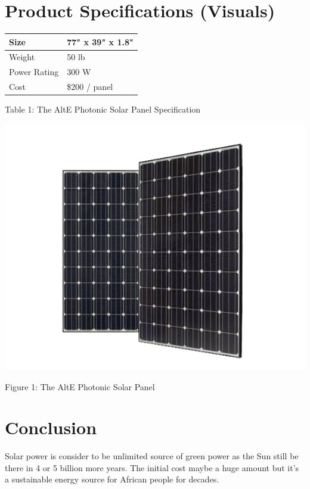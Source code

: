 \documentclass[letterpaper, 11pt]{article}
\begin{document}
\section*{Product Specifications (Visuals)}
\begin{center}
    \begin{tabular}{| l | l |}
    \hline
    Size & 77" x 39" x 1.8"  \\ \hline
    Weight & 50 lb  \\ \hline
    Power Rating & 300 W \\ \hline
    Cost & \$200 / panel \\ \hline
    \end{tabular}
    \linebreak\linebreak Table 1: The AltE Photonic Solar Panel Specification
    
    \includegraphics[scale=0.3]{solar}
    
    Figure 1: The AltE Photonic Solar Panel
    
\end{center}

\section*{Conclusion}
Solar power is consider to be unlimited source of green power as the Sun still be there in 4 or 5 billion more years. The initial cost maybe a huge amount but it’s a sustainable energy source for African people for decades.
\end{document}
